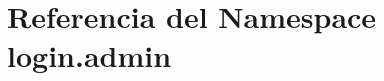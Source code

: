 \hypertarget{namespacelogin_1_1admin}{}\section{Referencia del Namespace login.\+admin}
\label{namespacelogin_1_1admin}
